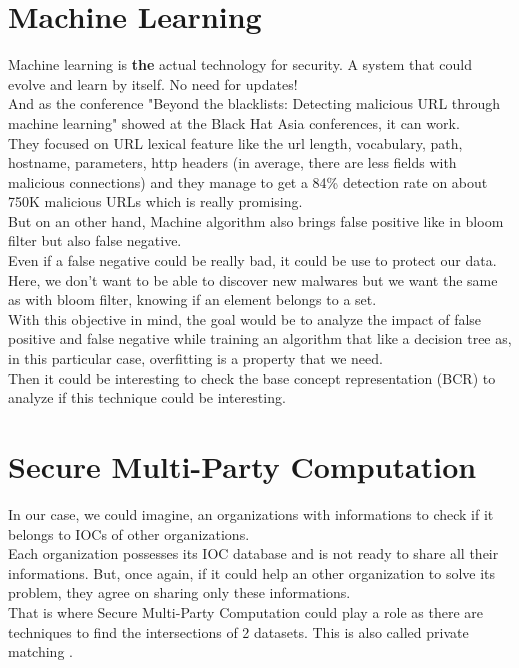 \documentclass{eplmastersthesis}
\begin{document}
\section{Machine Learning}

Machine learning is \textbf{the} actual technology for security. A system that could evolve and learn by itself. No need for updates! \\
And as the conference "Beyond the blacklists: Detecting malicious URL through machine learning" showed at the Black Hat Asia conferences, it can work.\\
They focused on URL lexical feature like the url length, vocabulary, path, hostname, parameters, http headers (in average, there are less fields with malicious connections) and they manage to get a 84\% detection rate on  about 750K malicious URLs which is really promising.\\

But on an other hand, Machine algorithm also brings false positive like in bloom filter but also false negative.\\
Even if a false negative could be really bad, it could be use to protect our data.\\
Here, we don't want to be able to discover new malwares but we want the same as with bloom filter, knowing if an element belongs to a set.\\
With this objective in mind, the goal would be to analyze the impact of false positive and false negative while training an algorithm that like a decision tree as, in this particular case, overfitting is a property that we need.\\
Then it could be interesting to check the base concept representation (BCR) to analyze if this technique could be interesting. \\



\section{Secure Multi-Party Computation}
In our case, we could imagine, an organizations with informations to check if it belongs to IOCs of other organizations.\\
Each organization possesses its IOC database and is not ready to share all their informations. But, once again, if it could help an other organization to solve its problem, they agree on sharing only these informations.\\
That is where Secure Multi-Party Computation could play a role as there are techniques to find the intersections of 2 datasets. This is also called private matching \cite{agrawal2003information, li2005private}.\\
\end{document}
